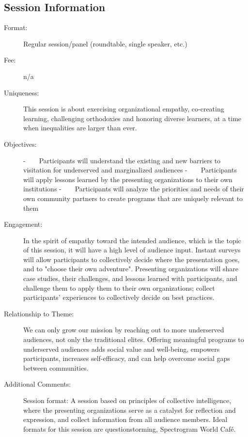 \documentclass{report}
\begin{document}
              \subsection*{Session Information}
                \begin{description}
                  \item [Format:] Regular session/panel (roundtable, single speaker, etc.)
							    
								  \item [Fee:]n/a
							     
							    \item [Uniqueness:]This session is about exercising organizational empathy, co-creating learning, challenging orthodoxies and honoring diverse learners, at a time when inequalities are larger than ever.
							    \item [Objectives:]-    Participants will understand the existing and new barriers to visitation for underserved and marginalized audiences
-    Participants will apply lessons learned by the presenting organizations to their own institutions
-    Participants will analyze the priorities and needs of their own community partners to create programs that are uniquely relevant to them
							    \item [Engagement:]In the spirit of empathy toward the intended audience, which is the topic of this session, it will have a high level of audience input. Instant surveys will allow participants to collectively decide where the presentation goes, and to "choose their own adventure". Presenting organizations will share case studies, their challenges, and lessons learned with participants, and challenge them to apply them to their own organizations; collect participants' experiences to collectively decide on best practices.
							    \item [Relationship to Theme:]We can only grow our mission by reaching out to more underserved audiences, not only the traditional elites. Offering meaningful programs to underserved audiences adds social value and well-being, empowers participants, increases self-efficacy, and can help overcome social gaps between communities.
							    
                    \item [Additional Comments: ]Session format: A session based on principles of collective intelligence, where the presenting organizations serve as a catalyst for reflection and expression, and collect information from all audience members. Ideal formats for this session are questionstorming, Spectrogram World Café.

                \end{description}
\end{document}
